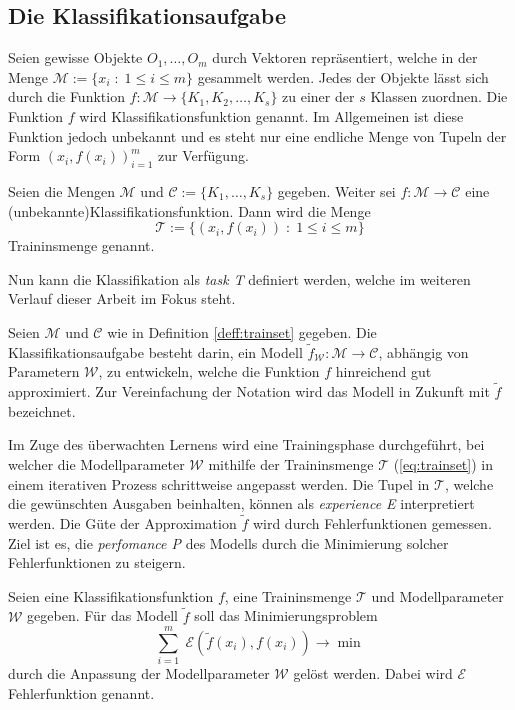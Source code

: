 \subsection{Die Klassifikationsaufgabe}
\label{abs:classtask}
Seien gewisse Objekte $O_1, \ldots, O_m$ durch Vektoren repräsentiert, welche in der Menge $\mathcal{M}:=\{x_i \; : \; 1 \leq i \leq m \}$ gesammelt werden. Jedes der Objekte lässt sich durch die Funktion $f:\mathcal{M} \rightarrow \{K_1, K_2, \ldots, K_s\}$ zu einer der $s$ Klassen zuordnen. Die Funktion $f$ wird Klassifikationsfunktion genannt. Im Allgemeinen ist diese Funktion jedoch unbekannt und es steht nur eine endliche Menge von Tupeln der Form $(x_i, f(x_i))_{i=1}^m$ zur Verfügung. 
\begin{defi}[Trainingsmenge]
    \label{deff:trainset}
    Seien die Mengen $\mathcal{M}$ und $\mathcal{C}:=\{K_1, \ldots, K_s \}$ gegeben. Weiter sei $f: \mathcal{M} \rightarrow \mathcal{C}$ eine (unbekannte)Klassifikationsfunktion. Dann wird die Menge 
    \begin{equation}
        \label{eq:trainset}
        \mathcal{T}:=\{(x_i, f(x_i))\; : \; 1 \leq i \leq m\}
    \end{equation} Traininsmenge genannt. 
\end{defi}
Nun kann die Klassifikation als \textit{task T} definiert werden, welche im weiteren Verlauf dieser Arbeit im Fokus steht.
\begin{defi}[Klassifikationsaufgabe]
    Seien $\mathcal{M}$ und $\mathcal{C}$ wie in Definition \ref{deff:trainset} gegeben. Die Klassifikationsaufgabe besteht darin, ein Modell $\tilde{f}_{\mathcal{W}}:\mathcal{M} \rightarrow \mathcal{C}$, abhängig von Parametern $\mathcal{W}$, zu entwickeln, welche die Funktion $f$ hinreichend gut approximiert. Zur Vereinfachung der Notation wird das Modell in Zukunft mit $\tilde{f}$ bezeichnet.
\end{defi}
Im Zuge des überwachten Lernens wird eine Trainingsphase durchgeführt, bei welcher die Modellparameter $\mathcal{W}$ mithilfe der Traininsmenge $\mathcal{T}$ (\ref{eq:trainset}) in einem iterativen Prozess schrittweise angepasst werden. Die Tupel in $\mathcal{T}$, welche die gewünschten Ausgaben beinhalten, können als \textit{experience E} interpretiert werden.
Die Güte der Approximation $\tilde{f}$ wird durch Fehlerfunktionen gemessen. Ziel ist es, die \textit{perfomance P} des Modells durch die Minimierung solcher Fehlerfunktionen zu steigern.  
\begin{defi}
    Seien eine Klassifikationsfunktion $f$, eine Traininsmenge $\mathcal{T}$ und Modellparameter $\mathcal{W}$ gegeben. Für das Modell $\tilde{f}$ soll das Minimierungsproblem 
    \begin{equation}
        \label{eq:opt_fund_abs}
        \sum_{i=1}^m \; \mathcal{E}(\tilde{f}(x_i),f(x_i)) \rightarrow \min
    \end{equation}
    durch die Anpassung der Modellparameter $\mathcal{W}$ gelöst werden. Dabei wird $\mathcal{E}$ Fehlerfunktion genannt.
\end{defi}
